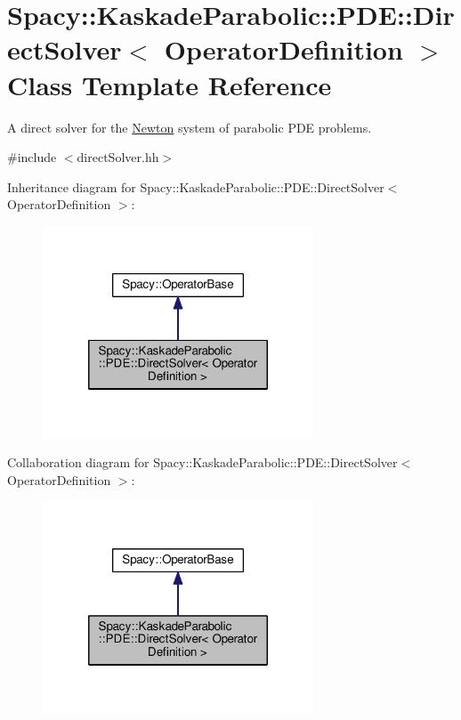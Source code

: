 \hypertarget{classSpacy_1_1KaskadeParabolic_1_1PDE_1_1DirectSolver}{\section{Spacy\-:\-:Kaskade\-Parabolic\-:\-:P\-D\-E\-:\-:Direct\-Solver$<$ Operator\-Definition $>$ Class Template Reference}
\label{classSpacy_1_1KaskadeParabolic_1_1PDE_1_1DirectSolver}
}


A direct solver for the \hyperlink{namespaceSpacy_1_1Newton}{Newton} system of parabolic P\-D\-E problems.  




{\ttfamily \#include $<$direct\-Solver.\-hh$>$}



Inheritance diagram for Spacy\-:\-:Kaskade\-Parabolic\-:\-:P\-D\-E\-:\-:Direct\-Solver$<$ Operator\-Definition $>$\-:
\nopagebreak
\begin{figure}[H]
\begin{center}
\leavevmode
\includegraphics[width=228pt]{classSpacy_1_1KaskadeParabolic_1_1PDE_1_1DirectSolver__inherit__graph}
\end{center}
\end{figure}


Collaboration diagram for Spacy\-:\-:Kaskade\-Parabolic\-:\-:P\-D\-E\-:\-:Direct\-Solver$<$ Operator\-Definition $>$\-:
\nopagebreak
\begin{figure}[H]
\begin{center}
\leavevmode
\includegraphics[width=228pt]{classSpacy_1_1KaskadeParabolic_1_1PDE_1_1DirectSolver__coll__graph}
\end{center}
\end{figure}
